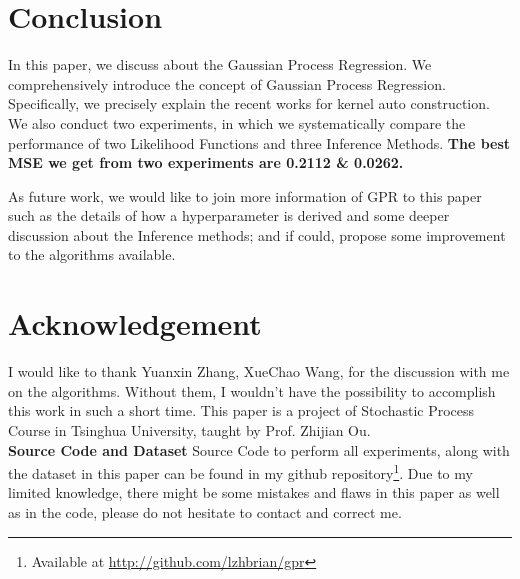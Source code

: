 \documentclass{sig-alternate-05-2015}
\newcommand{\para}[1]{{\vspace{2pt} \bf \noindent #1 \hspace{8pt}}}
\begin{document}











\section{Conclusion} \label{sec:conclusion}
In this paper, we discuss about the Gaussian Process Regression.
We comprehensively introduce the concept of Gaussian Process Regression.
Specifically, we precisely explain the recent works for kernel auto construction.
We also conduct two experiments, in which we systematically compare the performance of two Likelihood Functions and three Inference Methods. 
\textbf{The best MSE we get from two experiments are 0.2112 \& 0.0262.}

As future work, we would like to join more information of GPR to this paper such as the details of how a hyperparameter is derived and some deeper discussion about the Inference methods; and if could, propose some improvement to the algorithms available.


\renewcommand{\baselinestretch}{1.1}
\balance
\section{Acknowledgement} \label{sec:acknowledgement}
I would like to thank Yuanxin Zhang, XueChao Wang, for the discussion with me on the algorithms. Without them, I wouldn't have the possibility to accomplish this work in such a short time. This paper is a project of Stochastic Process Course in Tsinghua University, taught by Prof. Zhijian Ou.\\

\para{Source Code and Dataset} Source Code to perform all experiments, along with the dataset in this paper can be found in my github repository\footnote{Available at \color{blue}\href{http://github.com/lzhbrian/gpr}{http://github.com/lzhbrian/gpr}}. Due to my limited knowledge, there might be some mistakes and flaws in this paper as well as in the code, please do not hesitate to contact and correct me.




\end{document}
